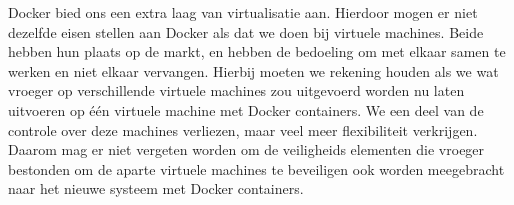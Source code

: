 Docker bied ons een extra laag van virtualisatie aan. Hierdoor mogen er niet dezelfde eisen stellen aan Docker als dat we doen bij virtuele machines. Beide hebben hun plaats op de markt, en hebben de bedoeling om met elkaar samen te werken en niet elkaar vervangen. Hierbij moeten we rekening houden als we wat vroeger op verschillende virtuele machines zou uitgevoerd worden nu laten uitvoeren op één virtuele machine met Docker containers. We een deel van de controle over deze machines verliezen, maar veel meer flexibiliteit verkrijgen. Daarom mag er niet vergeten worden om de veiligheids elementen die vroeger bestonden om de aparte virtuele machines te beveiligen ook worden meegebracht naar het nieuwe systeem met Docker containers.
